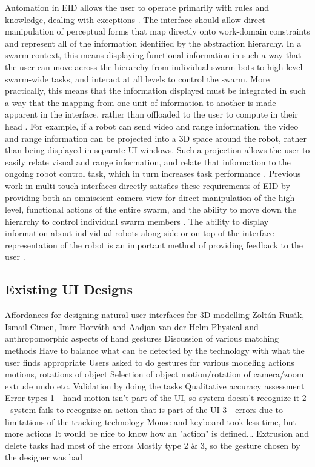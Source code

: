 Automation in EID allows the user to operate primarily with rules and knowledge, dealing with exceptions \cite{vicente2002ecological}.
The interface should allow direct manipulation of perceptual forms that map directly onto work-domain constraints and represent all of the information identified by the abstraction hierarchy. 
In a swarm context, this means displaying functional information in such a way that the user can move across the hierarchy from individual swarm bots to high-level swarm-wide tasks, and interact at all levels to control the swarm. 
More practically, this means that the information displayed must be integrated in such a way that the mapping from one unit of information to another is made apparent in the interface, rather than offloaded to the user to compute in their head \cite{yanco2004beyond}. 
For example, if a robot can send video and range information, the video and range information can be projected into a 3D space around the robot, rather than being displayed in separate UI windows.
Such a projection allows the user to easily relate visual and range information, and relate that information to the ongoing robot control task, which in turn increases task performance \cite{ricks2004ecological}.
Previous work in multi-touch interfaces directly satisfies these requirements of EID by providing both an omniscient camera view for direct manipulation of the high-level, functional actions of the entire swarm, and the ability to move down the hierarchy to control individual swarm members \cite{Micire:2009:ANG:1731903.1731912}.
The ability to display information about individual robots along side or on top of the interface representation of the robot is an important method of providing feedback to the user \cite{Kato:2009:MIC:1520340.1520500}. 

\subsection{Existing UI Designs}


Affordances for designing natural user interfaces for 3D modelling
Zoltán Rusák, Ismail Cimen, Imre Horváth and Aadjan van der Helm
	Physical and anthropomorphic aspects of hand gestures
	Discussion of various matching methods
	Have to balance what can be detected by the technology with what the user finds appropriate
	Users asked to do gestures for various modeling actions
		motions, rotations of object
		Selection of object
		motion/rotation of camera/zoom
		extrude
		undo
		etc.
	Validation by doing the tasks
		Qualitative accuracy assessment
	Error types
		1 - hand motion isn't part of the UI, so system doesn't recognize it
		2 - system fails to recognize an action that is part of the UI
		3 - errors due to limitations of the tracking technology
	Mouse and keyboard took less time, but more actions
		It would be nice to know how an "action" is defined...
	Extrusion and delete tasks had most of the errors
		Mostly type 2 \& 3, so the gesture chosen by the designer was bad

